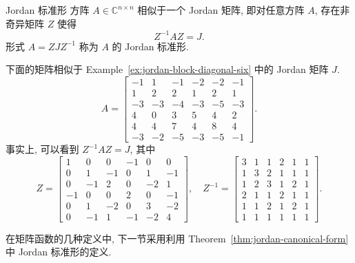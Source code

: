 \begin{Theorem}{{Jordan 标准形}}\label{thm:jordan-canonical-form}
{方阵 $A\in\mathbb{C}^{n\times n}$ 相似于一个 Jordan 矩阵, 即对任意方阵 $A$, 存在非奇异矩阵 $Z$ 使得}
\[Z^{-1}AZ=J.\]
{形式 $A=ZJZ^{-1}$ 称为 $A$ 的 Jordan 标准形.}
\end{Theorem}

\begin{Example}\label{ex:jordan-similarity-six}
{下面的矩阵相似于 Example~\ref{ex:jordan-block-diagonal-six} 中的 Jordan 矩阵 $J$.}
\[
A=\begin{bmatrix}-1&1&-1&-2&-2&-1\\1&2&2&1&2&1\\-3&-3&-4&-3&-5&-3\\4&0&3&5&4&2\\4&4&7&4&8&4\\-3&-2&-5&-3&-5&-1\end{bmatrix}.
\]
{事实上, 可以看到 $Z^{-1}AZ=J$, 其中}
\[
Z=\begin{bmatrix}1&0&0&-1&0&0\\0&1&-1&0&1&-1\\0&-1&2&0&-2&1\\-1&0&0&2&0&-1\\0&1&-2&0&3&-2\\0&-1&1&-1&-2&4\end{bmatrix},\quad
Z^{-1}=\begin{bmatrix}3&1&1&2&1&1\\1&3&2&1&1&1\\1&2&3&1&2&1\\2&1&1&2&1&1\\1&1&2&1&2&1\\1&1&1&1&1&1\end{bmatrix}.
\]
\end{Example}

{\leavevmode{}\label{srcpage:printed-191}在矩阵函数的几种定义中, 下一节采用利用 Theorem~\ref{thm:jordan-canonical-form} 中 Jordan 标准形的定义.}

